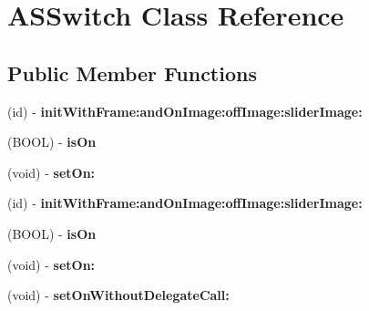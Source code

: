 \hypertarget{interface_a_s_switch}{
\section{\-A\-S\-Switch \-Class \-Reference}
\label{interface_a_s_switch}
}
\subsection*{\-Public \-Member \-Functions}
\begin{DoxyCompactItemize}
\item 
\hypertarget{interface_a_s_switch_a2abf9cb65a3bbdf78a4d655893a26e4f}{
(id) -\/ {\bfseries init\-With\-Frame\-:and\-On\-Image\-:off\-Image\-:slider\-Image\-:}}
\label{interface_a_s_switch_a2abf9cb65a3bbdf78a4d655893a26e4f}

\item 
\hypertarget{interface_a_s_switch_abdade85f53a1b66888175590095e5bd9}{
(\-B\-O\-O\-L) -\/ {\bfseries is\-On}}
\label{interface_a_s_switch_abdade85f53a1b66888175590095e5bd9}

\item 
\hypertarget{interface_a_s_switch_a7e3ee75e6003a2a94ed753f76fe42df9}{
(void) -\/ {\bfseries set\-On\-:}}
\label{interface_a_s_switch_a7e3ee75e6003a2a94ed753f76fe42df9}

\item 
\hypertarget{interface_a_s_switch_a2abf9cb65a3bbdf78a4d655893a26e4f}{
(id) -\/ {\bfseries init\-With\-Frame\-:and\-On\-Image\-:off\-Image\-:slider\-Image\-:}}
\label{interface_a_s_switch_a2abf9cb65a3bbdf78a4d655893a26e4f}

\item 
\hypertarget{interface_a_s_switch_abdade85f53a1b66888175590095e5bd9}{
(\-B\-O\-O\-L) -\/ {\bfseries is\-On}}
\label{interface_a_s_switch_abdade85f53a1b66888175590095e5bd9}

\item 
\hypertarget{interface_a_s_switch_a7e3ee75e6003a2a94ed753f76fe42df9}{
(void) -\/ {\bfseries set\-On\-:}}
\label{interface_a_s_switch_a7e3ee75e6003a2a94ed753f76fe42df9}

\item 
\hypertarget{interface_a_s_switch_a2ac2c8d7c8353bb33c489c7633beba1f}{
(void) -\/ {\bfseries set\-On\-Without\-Delegate\-Call\-:}}
\label{interface_a_s_switch_a2ac2c8d7c8353bb33c489c7633beba1f}

\end{DoxyCompactItemize}
